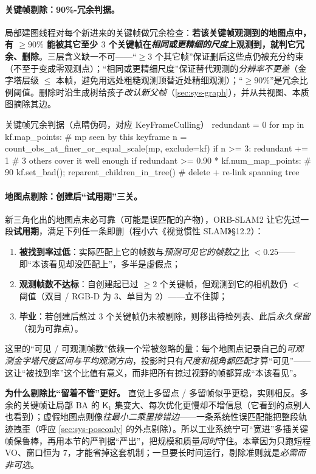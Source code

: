 \paragraph{关键帧剔除：90\%-冗余判据。}
局部建图线程对每个新进来的关键帧做冗余检查：\textbf{若该关键帧观测到的地图点中，有 $\ge 90\%$ 能被其它至少 $3$ 个关键帧在\emph{相同或更精细的尺度}上观测到，就判它冗余、删除}。三层含义缺一不可——“$\ge 3$ 个其它帧”保证删后这些点仍被充分约束（不至于变成零观测点）；“相同或更精细尺度”保证替代观测的\emph{分辨率不更差}（金字塔层级 $\le$ 本帧，避免用远处粗糙观测顶替近处精细观测）；“$\ge 90\%$”是冗余比例阈值。删除时沿生成树给孩子\emph{改认新父帧}（\cref{sec:sys-graph}），并从共视图、本质图摘除其边。
\begin{codebox}[text]{关键帧冗余判据（点睛伪码，对应 KeyFrameCulling）}
redundant = 0
for mp in kf.map_points:                      # mp seen by this keyframe
    n = count_obs_at_finer_or_equal_scale(mp, exclude=kf)
    if n >= 3: redundant += 1                  # 3 others cover it well enough
if redundant >= 0.90 * kf.num_map_points:      # 90%
    kf.set_bad(); reparent_children_in_tree()  # delete + re-link spanning tree
\end{codebox}

\paragraph{地图点剔除：创建后“试用期”三关。}
新三角化出的地图点未必可靠（可能是误匹配的产物），ORB-SLAM2 让它先过一段\textbf{试用期}，满足下列任一条即删（程小六《视觉惯性 SLAM》§12.2）：
\begin{enumerate}
  \item \textbf{被找到率过低}：实际匹配上它的帧数与\emph{预测可见它的帧数}之比 $<0.25$——即“本该看见却没匹配上”，多半是虚假点；
  \item \textbf{观测帧数不达标}：自创建起已过 $\ge 2$ 个关键帧，但观测到它的相机数仍 $<$ 阈值（双目 / RGB-D 为 $3$、单目为 $2$）——立不住脚；
  \item \textbf{毕业}：若创建后熬过 $3$ 个关键帧仍未被剔除，则移出待检列表、此后\emph{永久保留}（视为可靠点）。
\end{enumerate}
这里的“可见 / 可观测帧数”依赖一个常被忽略的量：每个地图点记录自己的\emph{可观测金字塔尺度区间与平均观测方向}，投影时只有\emph{尺度和视角都匹配}才算“可见”——这让“被找到率”这个比值有意义，而非把所有掠过视野的帧都算成“本该看见”。

\begin{insight}
\textbf{为什么剔除比“留着不管”更好。}
直觉上多留点 / 多留帧似乎更稳，实则相反。多余的关键帧让局部 BA 的 $\mathsf{K}_1$ 集变大、每次优化更慢却不增信息（它看到的点别人也看到）；虚假地图点则像\emph{往最小二乘里掺错边}——一条系统性误匹配能把整段轨迹拽歪（呼应 \cref{sec:sys-poseonly} 的外点剔除）。所以工业系统宁可“宽进”多插关键帧保鲁棒，再用本节的严判据“严出”，把规模和质量\emph{同时}守住。本章因为只跑短程 VO、窗口恒为 $7$，才能省掉这套机制；一旦要长时间运行，剔除准则就是\emph{必需而非可选}。
\end{insight}

